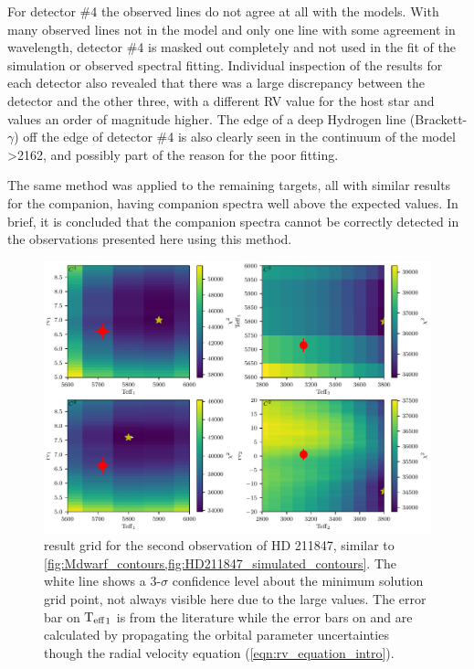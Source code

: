 For detector \#4 the observed lines do not agree at all with the models.
With many observed lines not in the model and only one line with some agreement in wavelength, detector \#4 is masked out completely and not used in the \textchisquared{} fit of the simulation or observed spectral fitting.
Individual inspection of the \textchisquared{} results for each detector also revealed that there was a large discrepancy between the  detector and the other three, with a different {RV} value for the host star and \textchisquared{} values an order of magnitude higher.
The edge of a deep Hydrogen line (Brackett-\(\gamma\)) off the edge of detector \#4 is also clearly seen in the continuum of the model >2162\nm{}, and possibly part of the reason for the poor fitting.

The same method was applied to the remaining targets, all with similar results for the companion, having companion spectra well above the expected values.
In brief, it is concluded that the companion spectra cannot be correctly detected in the observations presented here using this method.


\begin{figure}
    \centering
    \includegraphics[width=0.8\linewidth]{figures/companion_recovery/HD211847_result_pcolors}
    \caption[\textchisquared{} contour for an observation {HD 211847}.]{\textchisquared{} result grid for the second observation of {HD 211847}, similar to \cref{fig:Mdwarf_contours,fig:HD211847_simulated_contours}.
        The white line shows a 3-\(\sigma\) confidence level about the minimum \textchisquared{} solution grid point, not always visible here due to the large \textchisquared{} values.
        The error bar on \({\textrm{T}_{\mathrm{eff}}}_{1}\) is from the literature while the error bars on \Rvone{} and \Rvtwo{} are calculated by propagating the orbital parameter uncertainties though the radial velocity equation (\cref{eqn:rv_equation_intro}).}
    \label{fig:HD211847_result_contours}
\end{figure}


